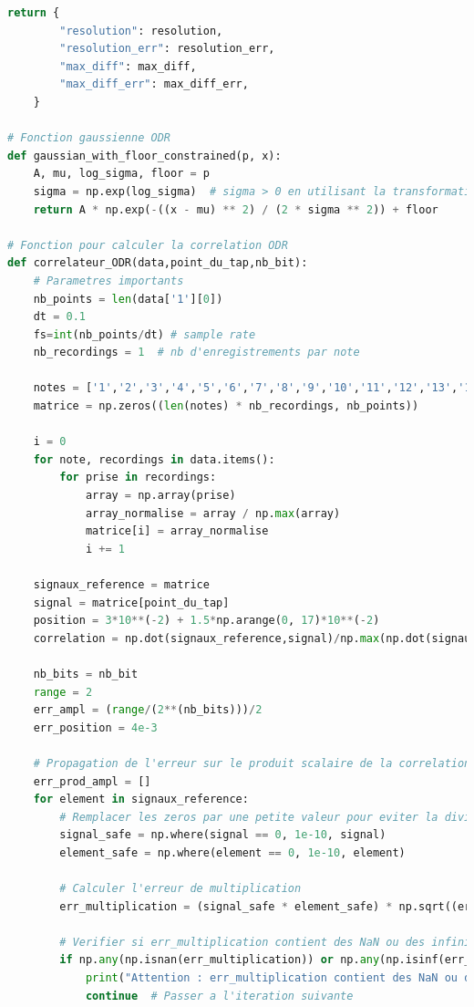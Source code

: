 ﻿\documentclass[11pt,letterpaper]{article}
\begin{document}
\begin{lstlisting}[language=python]
    return {
        "resolution": resolution,
        "resolution_err": resolution_err,
        "max_diff": max_diff,
        "max_diff_err": max_diff_err,
    }

# Fonction gaussienne ODR
def gaussian_with_floor_constrained(p, x):
    A, mu, log_sigma, floor = p
    sigma = np.exp(log_sigma)  # sigma > 0 en utilisant la transformation exponentielle
    return A * np.exp(-((x - mu) ** 2) / (2 * sigma ** 2)) + floor

# Fonction pour calculer la correlation ODR
def correlateur_ODR(data,point_du_tap,nb_bit):
    # Parametres importants
    nb_points = len(data['1'][0])  
    dt = 0.1
    fs=int(nb_points/dt) # sample rate
    nb_recordings = 1  # nb d'enregistrements par note

    notes = ['1','2','3','4','5','6','7','8','9','10','11','12','13','14','15','16','17']
    matrice = np.zeros((len(notes) * nb_recordings, nb_points))

    i = 0
    for note, recordings in data.items():
        for prise in recordings:
            array = np.array(prise)
            array_normalise = array / np.max(array)
            matrice[i] = array_normalise
            i += 1

    signaux_reference = matrice
    signal = matrice[point_du_tap]
    position = 3*10**(-2) + 1.5*np.arange(0, 17)*10**(-2)
    correlation = np.dot(signaux_reference,signal)/np.max(np.dot(signaux_reference,signal))

    nb_bits = nb_bit
    range = 2
    err_ampl = (range/(2**(nb_bits)))/2
    err_position = 4e-3

    # Propagation de l'erreur sur le produit scalaire de la correlation
    err_prod_ampl = []
    for element in signaux_reference:
        # Remplacer les zeros par une petite valeur pour eviter la division par zero
        signal_safe = np.where(signal == 0, 1e-10, signal)
        element_safe = np.where(element == 0, 1e-10, element)

        # Calculer l'erreur de multiplication
        err_multiplication = (signal_safe * element_safe) * np.sqrt((err_ampl / signal_safe) ** 2 + (err_ampl / element_safe) ** 2)

        # Verifier si err_multiplication contient des NaN ou des infinis
        if np.any(np.isnan(err_multiplication)) or np.any(np.isinf(err_multiplication)):
            print("Attention : err_multiplication contient des NaN ou des infinis.")
            continue  # Passer a l'iteration suivante


\end{lstlisting}
\end{document}
